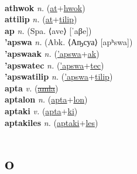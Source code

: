  \label{'atlaslawtak} \\
\textbf{athwok} \textit{n.} (\hyperref[at]{at}+\hyperref[hwok]{hwok})
 \label{athwok} \\
\textbf{attilip} \textit{n.} (\hyperref[at]{at}+\hyperref[tilip]{tilip})
 \label{attilip} \\
\textbf{ap} \textit{n.} (Spa. ⟨ave⟩ [ˈaβe])
 \label{ap} \\
\textbf{'apswa} \textit{n.} (Abk. ⟨Аҧсуа⟩ [apʰswa])
 \label{'apswa} \\
\textbf{'apswaak} \textit{n.} (\hyperref['apswa]{'apswa}+\hyperref[ak]{ak})
 \label{'apswaak} \\
\textbf{'apswatec} \textit{n.} (\hyperref['apswa]{'apswa}+\hyperref[tec]{tec})
 \label{'apswatec} \\
\textbf{'apswatilip} \textit{n.} (\hyperref['apswa]{'apswa}+\hyperref[tilip]{tilip})
 \label{'apswatilip} \\
\textbf{apta} \textit{v.} (\hyperref[amla]{\sout{amla}})
 \label{apta} \\
\textbf{aptalon} \textit{n.} (\hyperref[apta]{apta}+\hyperref[lon]{lon})
 \label{aptalon} \\
\textbf{aptaki} \textit{v.} (\hyperref[apta]{apta}+\hyperref[ki]{ki})
 \label{aptaki} \\
\textbf{aptakiles} \textit{n.} (\hyperref[aptaki]{aptaki}+\hyperref[les]{les})
 \label{aptakiles} 

\section{o}

